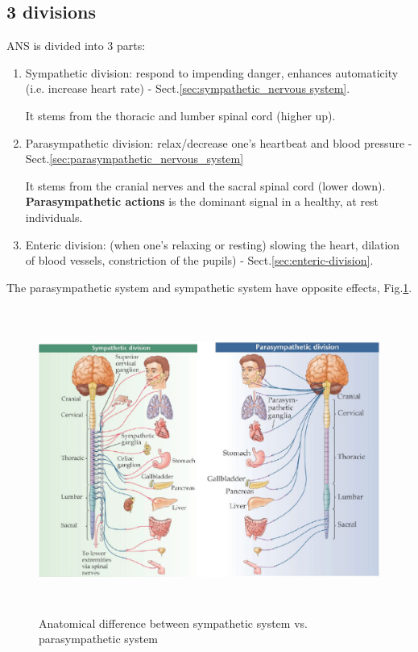 \subsection{3 divisions}

ANS is divided into 3 parts:

\begin{enumerate}

   \item Sympathetic division: respond to impending danger, enhances
  automaticity (i.e. increase heart rate) - Sect.\ref{sec:sympathetic_nervous
  system}. 

It stems from the thoracic and lumber spinal cord (higher up).

   \item Parasympathetic division: relax/decrease one's heartbeat and blood
   pressure - Sect.\ref{sec:parasympathetic_nervous_system}

It stems from the cranial nerves and the sacral spinal cord (lower down).  
{\bf Parasympathetic actions} is the dominant signal in a healthy, at rest
individuals.
 
   \item Enteric division: (when one's relaxing or resting) slowing the
  heart, dilation of blood vessels, constriction of the pupils) -
  Sect.\ref{sec:enteric-division}.
    
\end{enumerate}

The parasympathetic system and sympathetic system have opposite effects,
Fig.\ref{fig:parasympathetic_sympathetic_nervous_systems}.

\begin{figure}[hbt]
  \centerline{
  \includegraphics[height=10cm,
    angle=0]{./images/parasympathetic_sympathetic_nervous_systems.eps}}
\caption{Anatomical difference between sympathetic system vs. parasympathetic
system}
\label{fig:parasympathetic_sympathetic_nervous_systems}
\end{figure}

